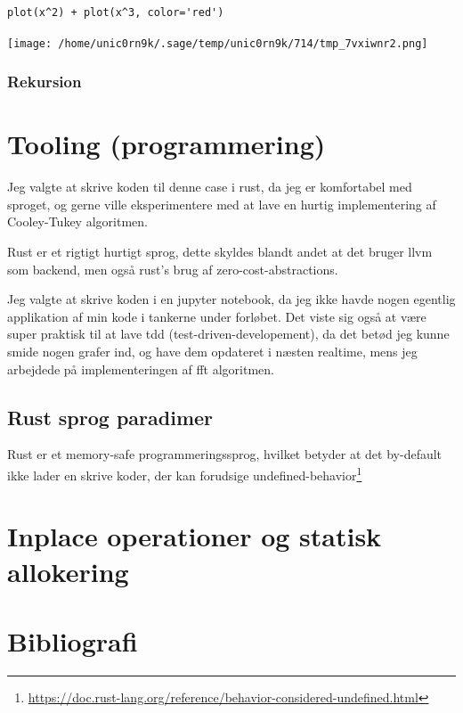 \documentclass[11pt,a4paper]{article}
\begin{document}
\begin{verbatim}
plot(x^2) + plot(x^3, color='red')
\end{verbatim}

\begin{center}
\texttt{[image: /home/unic0rn9k/.sage/temp/unic0rn9k/714/tmp\_7vxiwnr2.png]}
\end{center}

\subsubsection{Rekursion}
\label{sec:org72cf811}

\section{Tooling (programmering)}
\label{sec:org5d56d9f}
Jeg valgte at skrive koden til denne case i rust, da jeg er komfortabel med sproget,
og gerne ville eksperimentere med at lave en hurtig implementering af Cooley-Tukey algoritmen.

Rust er et rigtigt hurtigt sprog, dette skyldes blandt andet at det bruger llvm som backend,
men også rust's brug af zero-cost-abstractions.

Jeg valgte at skrive koden i en jupyter notebook, da jeg ikke havde nogen egentlig
applikation af min kode i tankerne under forløbet.
Det viste sig også at være super praktisk til at lave tdd (test-driven-developement),
da det betød jeg kunne smide nogen grafer ind, og have dem opdateret i næsten realtime,
mens jeg arbejdede på implementeringen af fft algoritmen.

\subsection{Rust sprog paradimer}
\label{sec:orgeafd531}
Rust er et memory-safe programmeringssprog,
hvilket betyder at det by-default ikke lader en skrive koder, der kan forudsige undefined-behavior\footnote{\url{https://doc.rust-lang.org/reference/behavior-considered-undefined.html}}

\section{Inplace operationer og statisk allokering}
\label{sec:org5b60235}

\section{Bibliografi}
\label{sec:orge27a4d6}
\end{document}
